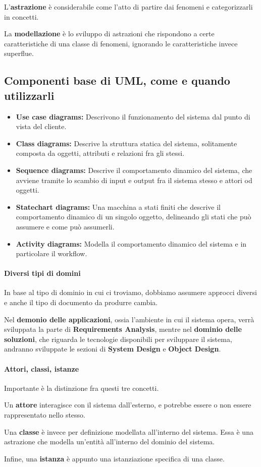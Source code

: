     L'\textbf{astrazione} è considerabile come l'atto di partire dai fenomeni e categorizzarli in concetti.
    
    La \textbf{modellazione} è lo sviluppo di astrazioni che rispondono a certe caratteristiche di una classe di fenomeni, ignorando le caratteristiche invece superflue.
    
\subsection{Componenti base di UML, come e quando utilizzarli}
    \begin{itemize}
        \item \textbf{Use case diagrams:} Descrivono il funzionamento del sistema dal punto di vista del cliente.
        \item \textbf{Class diagrams:} Descrive la struttura statica del sistema, solitamente composta da oggetti, attributi e relazioni fra gli stessi.
        \item \textbf{Sequence diagrams:} Descrive il comportamento dinamico del sistema, che avviene tramite lo scambio di input e output fra il sistema stesso e attori od oggetti.
        \item \textbf{Statechart diagrams:} Una macchina a stati finiti che descrive il comportamento dinamico di un singolo oggetto, delineando gli stati che può assumere e come può assumerli.
        \item \textbf{Activity diagrams:} Modella il comportamento dinamico del sistema e in particolare il workflow.
    \end{itemize}
    
    \paragraph{Diversi tipi di domini} In base al tipo di dominio in cui ci troviamo, dobbiamo assumere approcci diversi e anche il tipo di documento da produrre cambia.
    
    Nel \textbf{demonio delle applicazioni}, ossia l'ambiente in cui il sistema opera, verrà sviluppata la parte di \textbf{Requirements Analysis}, mentre nel \textbf{dominio delle soluzioni}, che riguarda le tecnologie disponibili per sviluppare il sistema, andranno sviluppate le sezioni di \textbf{System Design} e \textbf{Object Design}.
    
    \paragraph{Attori, classi, istanze} Importante è la distinzione fra questi tre concetti.
    
    Un \textbf{attore} interagisce con il sistema dall'esterno, e potrebbe essere o non essere rappresentato nello stesso.
    
    Una \textbf{classe} è invece per definizione modellata all'interno del sistema. Essa è una astrazione che modella un'entità all'interno del dominio del sistema.
    
    Infine, una \textbf{istanza} è appunto una istanziazione specifica di una classe.